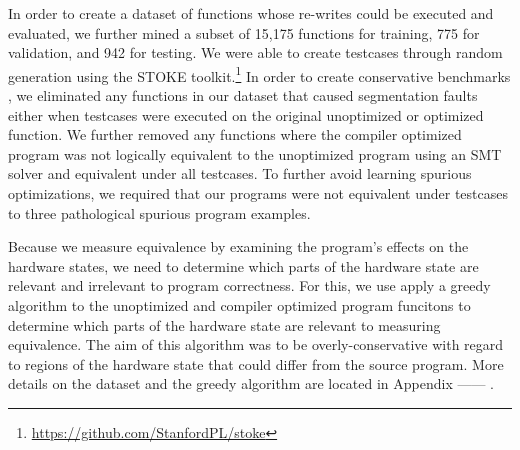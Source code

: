 \documentclass{article}
\begin{document}
In order to create a dataset of functions whose re-writes could be executed and evaluated, we further mined a subset of 15,175 functions for training, 775 for validation, and 942 for testing.   We were able to create testcases through random generation using the \textsc{STOKE} toolkit.\footnote{\url{https://github.com/StanfordPL/stoke}}   In order to create conservative benchmarks , we eliminated any functions in our dataset that caused segmentation faults either when testcases were executed on the original unoptimized or optimized function.  We further removed any functions where the compiler optimized program was not logically equivalent to the unoptimized program using an SMT solver and equivalent under all testcases.  To further avoid learning spurious optimizations, we required that our programs were not equivalent under testcases to three pathological spurious program examples. 

Because we measure equivalence by examining the program's effects on the hardware states, we need to determine which parts of the hardware state are relevant and irrelevant to program correctness.   For this, we use apply a greedy algorithm to the unoptimized and compiler optimized program funcitons to determine which parts of the hardware state are relevant to measuring equivalence. The aim of this algorithm was to be overly-conservative with regard to regions of the hardware state that could differ from the source program. More details on the dataset and the greedy algorithm are located in Appendix ------  .
\end{document}
